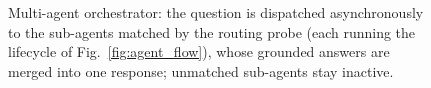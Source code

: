 \begin{figure}[t]
{
    }
    \caption{Multi-agent orchestrator: the question is dispatched asynchronously to the sub-agents matched by the routing probe (each running the lifecycle of Fig.~\ref{fig:agent_flow}), whose grounded answers are merged into one response; unmatched sub-agents stay inactive.}
    \label{fig:agent_flow_swarm}
\end{figure}
